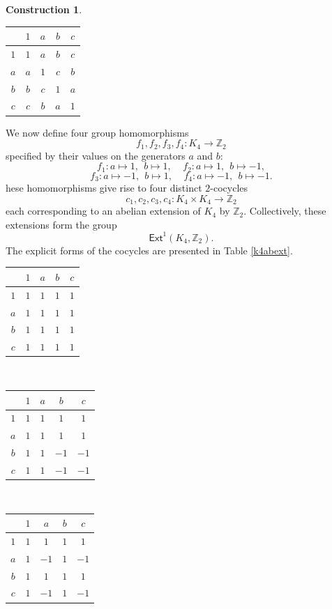 \documentclass{article}
\theoremstyle{plain}
\theoremstyle{definition}
\newtheorem{const}[thm]{Construction}
\begin{document}
\begin{const}
\begin{table}[H]
\centering
\begin{tabular}{ c | c   c   c   c}
& $1$ & $a$ & $b$ & $c$ \\
\hline
$1$ & $1$ & $a$ & $b$ & $c$ \\
$a$ & $a$ & $1$ & $c$ & $b$ \\
$b$ & $b$ & $c$ & $1$ & $a$ \\
$c$ & $c$ & $b$ & $a$ & $1$
\end{tabular}
\end{table}
We now define four group homomorphisms $$f_1, f_2, f_3, f_4:K_4 \longrightarrow \mathbb{Z}_2$$ specified by their values on the generators $a$ and $b$:
\[
f_1:a \longmapsto 1, ~~ b \longmapsto 1, ~~~~~ f_2:a  \longmapsto 1, ~~ b \longmapsto -1,
\]
\[
f_3:a  \longmapsto -1, ~~ b \longmapsto 1, ~~~~~ f_4:a \longmapsto -1, ~~ b \longmapsto -1.
\]
hese homomorphisms give rise to four distinct $2$-cocycles
\[
c_1, c_2, c_3, c_4: K_4 \times K_4 \longrightarrow \mathbb{Z}_2
\]
each corresponding to an abelian extension of $K_4$ by $\mathbb{Z}_2$. Collectively, these extensions form the group $$\mathsf{Ext}^1(K_4,\mathbb{Z}_2).$$
The explicit forms of the cocycles are presented in Table \ref{k4abext}.
\begin{table}[H]
\centering
\begin{tabular}{ c | c   c   c   c}
& $1$ & $a$ & $b$ & $c$ \\
\hline
$1$ & $1$ & $1$ & $1$ & $1$ \\
$a$ & $1$ & $1$ & $1$ & $1$ \\
$b$ & $1$ & $1$ & $1$ & $1$ \\
$c$ & $1$ & $1$ & $1$ & $1$
\end{tabular} ~~~~~
\begin{tabular}{ c | c   c   c   c}
& $1$ & $a$ & $b$ & $c$ \\
\hline
$1$ & $1$ & $1$ & $1$ & $1$ \\
$a$ & $1$ & $1$ & $1$ & $1$ \\
$b$ & $1$ & $1$ & $-1$ & $-1$ \\
$c$ & $1$ & $1$ & $-1$ & $-1$
\end{tabular} ~~~~~
\begin{tabular}{ c | c   c   c   c}
& $1$ & $a$ & $b$ & $c$ \\
\hline
$1$ & $1$ & $1$ & $1$ & $1$ \\
$a$ & $1$ & $-1$ & $1$ & $-1$ \\
$b$ & $1$ & $1$ & $1$ & $1$ \\
$c$ & $1$ & $-1$ & $1$ & $-1$
\end{tabular} ~~~~~

\end{table}
\end{const}
\end{document}
